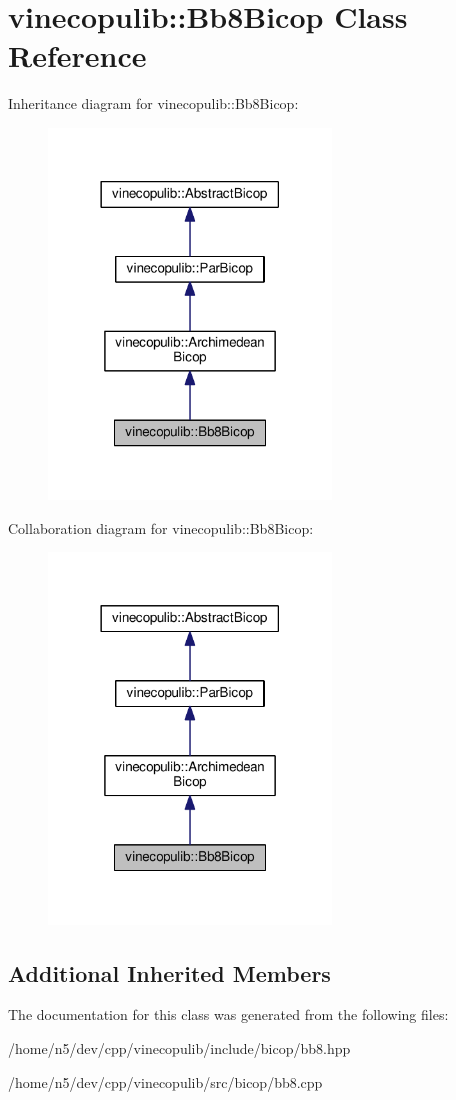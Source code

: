 \hypertarget{classvinecopulib_1_1_bb8_bicop}{}\section{vinecopulib\+:\+:Bb8\+Bicop Class Reference}
\label{classvinecopulib_1_1_bb8_bicop}


Inheritance diagram for vinecopulib\+:\+:Bb8\+Bicop\+:\nopagebreak
\begin{figure}[H]
\begin{center}
\leavevmode
\includegraphics[width=213pt]{classvinecopulib_1_1_bb8_bicop__inherit__graph}
\end{center}
\end{figure}


Collaboration diagram for vinecopulib\+:\+:Bb8\+Bicop\+:\nopagebreak
\begin{figure}[H]
\begin{center}
\leavevmode
\includegraphics[width=213pt]{classvinecopulib_1_1_bb8_bicop__coll__graph}
\end{center}
\end{figure}
\subsection*{Additional Inherited Members}


The documentation for this class was generated from the following files\+:\begin{DoxyCompactItemize}
\item 
/home/n5/dev/cpp/vinecopulib/include/bicop/bb8.\+hpp\item 
/home/n5/dev/cpp/vinecopulib/src/bicop/bb8.\+cpp\end{DoxyCompactItemize}

